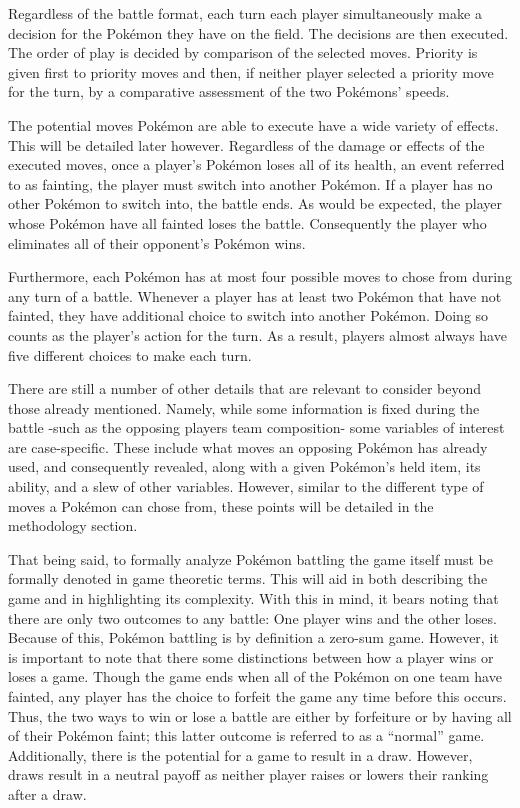 \documentclass[12pt,twoside]{reedthesis}
\begin{document}
  Regardless of the battle format, each turn each player simultaneously
  make a decision for the Pokémon they have on the field. The decisions
  are then executed. The order of play is decided by comparison of the
  selected moves. Priority is given first to priority moves and then, if
  neither player selected a priority move for the turn, by a comparative
  assessment of the two Pokémons' speeds.
  
  The potential moves Pokémon are able to execute have a wide variety of
  effects. This will be detailed later however. Regardless of the damage
  or effects of the executed moves, once a player's Pokémon loses all of
  its health, an event referred to as fainting, the player must switch
  into another Pokémon. If a player has no other Pokémon to switch into,
  the battle ends. As would be expected, the player whose Pokémon have all
  fainted loses the battle. Consequently the player who eliminates all of
  their opponent's Pokémon wins.
  
  Furthermore, each Pokémon has at most four possible moves to chose from
  during any turn of a battle. Whenever a player has at least two Pokémon
  that have not fainted, they have additional choice to switch into
  another Pokémon. Doing so counts as the player's action for the turn. As
  a result, players almost always have five different choices to make each
  turn.
  
  There are still a number of other details that are relevant to consider
  beyond those already mentioned. Namely, while some information is fixed
  during the battle -such as the opposing players team composition- some
  variables of interest are case-specific. These include what moves an
  opposing Pokémon has already used, and consequently revealed, along with
  a given Pokémon's held item, its ability, and a slew of other variables.
  However, similar to the different type of moves a Pokémon can chose
  from, these points will be detailed in the methodology section.
  
  That being said, to formally analyze Pokémon battling the game itself
  must be formally denoted in game theoretic terms. This will aid in both
  describing the game and in highlighting its complexity. With this in
  mind, it bears noting that there are only two outcomes to any battle:
  One player wins and the other loses. Because of this, Pokémon battling
  is by definition a zero-sum game. However, it is important to note that
  there some distinctions between how a player wins or loses a game.
  Though the game ends when all of the Pokémon on one team have fainted,
  any player has the choice to forfeit the game any time before this
  occurs. Thus, the two ways to win or lose a battle are either by
  forfeiture or by having all of their Pokémon faint; this latter outcome
  is referred to as a ``normal'' game. Additionally, there is the
  potential for a game to result in a draw. However, draws result in a
  neutral payoff as neither player raises or lowers their ranking after a
  draw.
  
\end{document}
